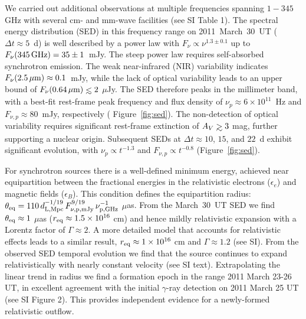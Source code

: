 We carried out additional observations at multiple frequencies
spanning $1-345$ GHz with several cm- and mm-wave facilities 
(see SI Table 1). The spectral energy distribution (SED) in this 
frequency range on 2011~March~30~UT ($\Delta t\approx 5$~d) is well 
described by a power law with $F_\nu\propto\nu^{1.3\pm 0.1}$ up to 
$F_\nu(345\,{\rm GHz})=35\pm 1$~mJy.  The steep power law requires 
self-absorbed synchrotron emission.  The weak near-infrared (NIR) 
variability\cite{ltc+11} indicates $F_\nu(2.5\,{\rm\mu m})\approx 
0.1$~mJy, while the lack of optical variability leads\cite{ltc+11} 
to an upper bound of $F_\nu(0.64\,{\rm \mu m})\simlt 2$ $\mu$Jy.  
The SED therefore peaks in the millimeter band, with a best-fit 
rest-frame peak frequency and flux density of $\nu_p\approx 6\times 
10^{11}$~Hz and $F_{\nu,p} \approx 80$~mJy, respectively (
Figure~\ref{fig:sed}).  The non-detection of optical variability 
requires significant rest-frame extinction of $A_V\simgt 3$ mag, 
further supporting a nuclear origin. Subsequent SEDs at 
$\Delta t\approx 10$, $15$, and $22$~d exhibit
significant evolution, with $\nu_p\propto t^{-1.3}$ and
$F_{\nu,p}\propto t^{-0.8}$ (Figure~\ref{fig:sed}).

For synchrotron sources there is a well-defined minimum energy,
achieved\cite{rea94} near equipartition between the fractional
energies in the relativistic electrons ($\epsilon_e$) and magnetic
fields ($\epsilon_B$).  This condition defines\cite{che98} the
equipartition radius: $\theta_{\rm eq}= 110\,d_{\rm
L,Mpc}^{-1/19}\,F_{\rm\nu, p,mJy}^{9/19}\,\nu_{\rm p,GHz}^{-1}$
$\mu$as.  From the March~30~UT SED we find $\theta_{\rm eq}\approx 1$
$\mu$as ($r_{\rm eq}\approx 1.5\times 10^{16}$ cm) and hence mildly
relativistic expansion with a Lorentz factor of $\Gamma\approx 2$.  A
more detailed model that accounts\cite{kn09} for relativistic effects
leads to a similar result, $r_{\rm eq}\approx 1\times 10^{16}$ cm and
$\Gamma\approx 1.2$ (see SI).  From the observed SED temporal
evolution we find that the source continues to expand relativistically
with nearly constant velocity (see SI text).  Extrapolating the linear
trend in radius we find a formation epoch in the range 2011 March
23-26 UT, in excellent agreement with the initial $\gamma$-ray
detection on 2011 March 25 UT (see SI Figure 2).  This provides 
independent evidence for a newly-formed relativistic outflow.

